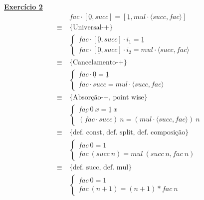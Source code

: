 \documentclass[a4paper,11pt]{article}
\begin{document}
	\noindent \underline{\textbf{Exercício 2}}\\
	\[
	\begin{aligned}
		&fac \cdot [\underline{0}, succ] = [\underline{1}, mul \cdot \langle succ, fac \rangle ] \\
		\equiv \  &\{\text{Universal-+}\}\\
		&\begin{cases}
			fac \cdot [\underline{0}, succ] \cdot i_1 = \underline{1} \\
			fac \cdot [\underline{0}, succ] \cdot i_2 = mul \cdot \langle succ, fac \rangle
		\end{cases}\\
		\equiv \  &\{\text{Cancelamento-+}\}\\
		&\begin{cases}
			fac \cdot \underline{0} = \underline{1} \\
			fac \cdot succ = mul \cdot \langle succ, fac \rangle
		\end{cases}\\
		\equiv \  &\{\text{Absorção-+, point wise}\}\\
		&\begin{cases}
			\underline{fac \ 0} \ x = \underline{1} \ x \\
			(fac \cdot succ) \ n = (mul \cdot \langle succ, fac \rangle) \ n
		\end{cases}\\
		\equiv \  &\{\text{def. const, def. split, def. composição}\}\\
		&\begin{cases}
			fac \ 0 = 1 \\
			fac \ (succ \ n) = mul \ (succ \ n, fac \ n)
		\end{cases}\\
		\equiv \  &\{\text{def. succ, def. mul}\}\\
		&\begin{cases}
			fac \ 0 = 1 \\
			fac \ (n + 1) = (n + 1) * fac \ n
		\end{cases}\\
	\end{aligned}
	\]
	
	\newpage
	
\end{document}
